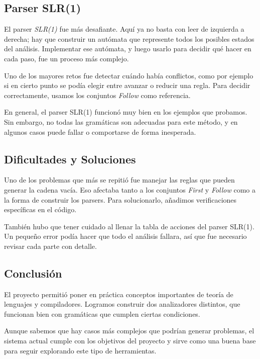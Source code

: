 \documentclass[12pt]{article}
\begin{document}
\subsection{Parser SLR(1)}

El parser \textit{SLR(1)} fue más desafiante. Aquí ya no basta con leer de izquierda a derecha; hay que construir un autómata que represente todos los posibles estados del análisis. Implementar ese autómata, y luego usarlo para decidir qué hacer en cada paso, fue un proceso más complejo.

Uno de los mayores retos fue detectar cuándo había conflictos, como por ejemplo si en cierto punto se podía elegir entre avanzar o reducir una regla. Para decidir correctamente, usamos los conjuntos \textit{Follow} como referencia.

En general, el parser SLR(1) funcionó muy bien en los ejemplos que probamos. Sin embargo, no todas las gramáticas son adecuadas para este método, y en algunos casos puede fallar o comportarse de forma inesperada.

\subsection{Dificultades y Soluciones}

Uno de los problemas que más se repitió fue manejar las reglas que pueden generar la cadena vacía. Eso afectaba tanto a los conjuntos \textit{First} y \textit{Follow} como a la forma de construir los parsers. Para solucionarlo, añadimos verificaciones específicas en el código.

También hubo que tener cuidado al llenar la tabla de acciones del parser SLR(1). Un pequeño error podía hacer que todo el análisis fallara, así que fue necesario revisar cada parte con detalle.

\subsection{Conclusión}

El proyecto permitió poner en práctica conceptos importantes de teoría de lenguajes y compiladores. Logramos construir dos analizadores distintos, que funcionan bien con gramáticas que cumplen ciertas condiciones.

Aunque sabemos que hay casos más complejos que podrían generar problemas, el sistema actual cumple con los objetivos del proyecto y sirve como una buena base para seguir explorando este tipo de herramientas.
\end{document}
